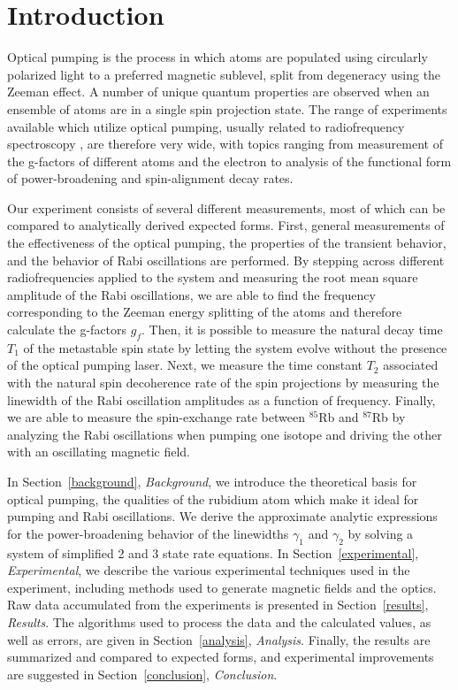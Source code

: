 
\section{Introduction}\label{introduction}

Optical pumping is the process in which atoms are populated using circularly polarized light to a preferred magnetic sublevel, split from degeneracy using the Zeeman effect. A number of unique quantum properties are observed when an ensemble of atoms are in a single spin projection state. The range of experiments available which utilize optical pumping, usually related to radiofrequency spectroscopy \cite{bloom}, are therefore very wide, with topics ranging from measurement of the g-factors of different atoms and the electron to analysis of the functional form of power-broadening and spin-alignment decay rates.

Our experiment consists of several different measurements, most of which can be compared to analytically derived expected forms. First, general measurements of the effectiveness of the optical pumping, the properties of the transient behavior, and the behavior of Rabi oscillations are performed. By stepping across different radiofrequencies applied to the system and measuring the root mean square amplitude of the Rabi oscillations, we are able to find the frequency corresponding to the Zeeman energy splitting of the atoms and therefore calculate the g-factors $g_{f}$. Then, it is possible to measure the natural decay time $T_{1}$ of the metastable spin state by letting the system evolve without the presence of the optical pumping laser. Next, we measure the time constant $T_{2}$ associated with the natural spin decoherence rate of the spin projections by measuring the linewidth of the Rabi oscillation amplitudes as a function of frequency. Finally, we are able to measure the spin-exchange rate between $^{85}$Rb and $^{87}$Rb by analyzing the Rabi oscillations when pumping one isotope and driving the other with an oscillating magnetic field.

In Section~\ref{background}, \emph{Background}, we introduce the theoretical basis for optical pumping, the qualities of the rubidium atom which make it ideal for pumping and Rabi oscillations. We derive the approximate analytic expressions for the power-broadening behavior of the linewidths $\gamma_{1}$ and $\gamma_{2}$ by solving a system of simplified 2 and 3 state rate equations. In Section~\ref{experimental}, \emph{Experimental}, we describe the various experimental techniques used in the experiment, including methods used to generate magnetic fields and the optics. Raw data accumulated from the experiments is presented in Section~\ref{results}, \emph{Results}. The algorithms used to process the data and the calculated values, as well as errors, are given in Section~\ref{analysis}, \emph{Analysis}. Finally, the results are summarized and compared to expected forms, and experimental improvements are suggested in Section~\ref{conclusion}, \emph{Conclusion}.